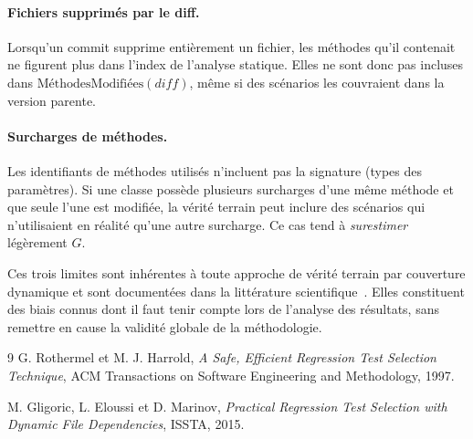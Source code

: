 \documentclass[12pt,a4paper]{article}
\begin{document}
\paragraph{Fichiers supprimés par le diff.}
Lorsqu'un commit supprime entièrement un fichier, les méthodes qu'il
contenait ne figurent plus dans l'index de l'analyse statique. Elles ne
sont donc pas incluses dans $\text{MéthodesModifiées}(\mathit{diff})$,
même si des scénarios les couvraient dans la version parente.

\paragraph{Surcharges de méthodes.}
Les identifiants de méthodes utilisés n'incluent pas la signature
(types des paramètres). Si une classe possède plusieurs surcharges d'une
même méthode et que seule l'une est modifiée, la vérité terrain peut
inclure des scénarios qui n'utilisaient en réalité qu'une autre surcharge.
Ce cas tend à \emph{surestimer} légèrement $G$.

\medskip
Ces trois limites sont inhérentes à toute approche de vérité terrain par
couverture dynamique et sont documentées dans la littérature
scientifique~\cite{rothermel1997, gligoric2015}. Elles constituent des
biais connus dont il faut tenir compte lors de l'analyse des résultats,
sans remettre en cause la validité globale de la méthodologie.

\begin{thebibliography}{9}
  G. Rothermel et M. J. Harrold,
  \emph{A Safe, Efficient Regression Test Selection Technique},
  ACM Transactions on Software Engineering and Methodology, 1997.

  M. Gligoric, L. Eloussi et D. Marinov,
  \emph{Practical Regression Test Selection with Dynamic File Dependencies},
  ISSTA, 2015.
\end{thebibliography}
\end{document}
